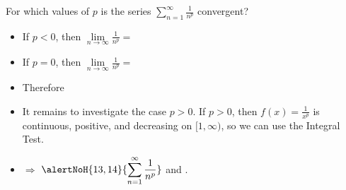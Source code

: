 \begin{frame}
\begin{example}
For which values of $p$ is the series $\displaystyle \sum_{n=1}^\infty \frac{1}{n^p}$ convergent?
\begin{itemize}
\item<2-| alert@2-3>  If $p < 0$, then $\lim\limits_{ n\to\infty} \frac{1}{n^p} = $
\item<4-| alert@4-5>  If $p = 0$, then $\lim\limits_{n \to \infty } \frac{ 1}{n^p} = $
\item<6-| alert@6-7>  Therefore 
\item<8->  It remains to investigate the case $p > 0$. If $p>0$, then $f(x) = \frac{1}{x^p}$ is continuous, positive, and decreasing on $[1, \infty)$, so we can use the Integral Test.

\item<13->  $\Rightarrow$ $\displaystyle \alertNoH{13,14}{\sum_{n=1}^\infty \frac{1}{n^p}}$  and .
\end{itemize}
\end{example}
\end{frame}
